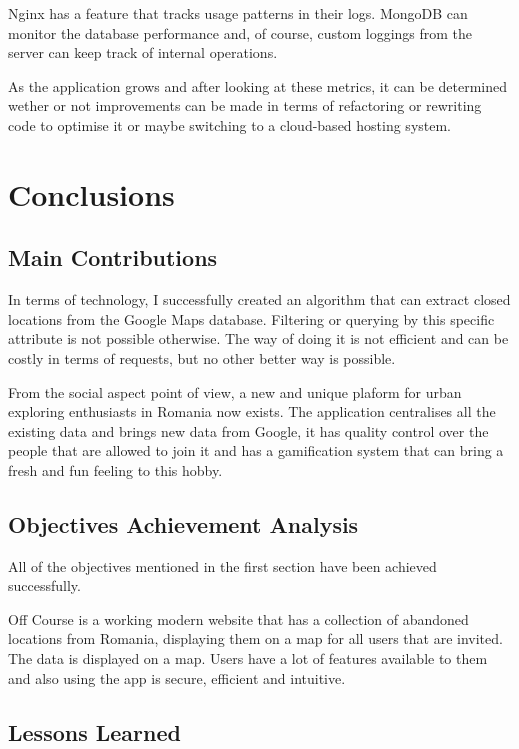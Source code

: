 \documentclass[12pt,a4paper]{report}
\begin{document}
Nginx has a feature that tracks usage patterns in their logs. MongoDB can monitor the database performance and, of course, custom loggings from the server can keep track of internal operations.

As the application grows and after looking at these metrics, it can be determined wether or not improvements can be made in terms of refactoring or rewriting code to optimise it or maybe switching to a cloud-based hosting system.

\chapter*{Conclusions}

\section*{Main Contributions}

In terms of technology, I successfully created an algorithm that can extract closed locations from the Google Maps database. Filtering or querying by this specific attribute is not possible otherwise. The way of doing it is not efficient and can be costly in terms of requests, but no other better way is possible.

From the social aspect point of view, a new and unique plaform for urban exploring enthusiasts in Romania now exists. The application centralises all the existing data and brings new data from Google, it has quality control over the people that are allowed to join it and has a gamification system that can bring a fresh and fun feeling to this hobby.

\section*{Objectives Achievement Analysis}

All of the objectives mentioned in the first section have been achieved successfully. 

Off Course is a working modern website that has a collection of abandoned locations from Romania, displaying them on a map for all users that are invited. The data is displayed on a map. Users have a lot of features available to them and also using the app is secure, efficient and intuitive.

\section*{Lessons Learned}
\end{document}
